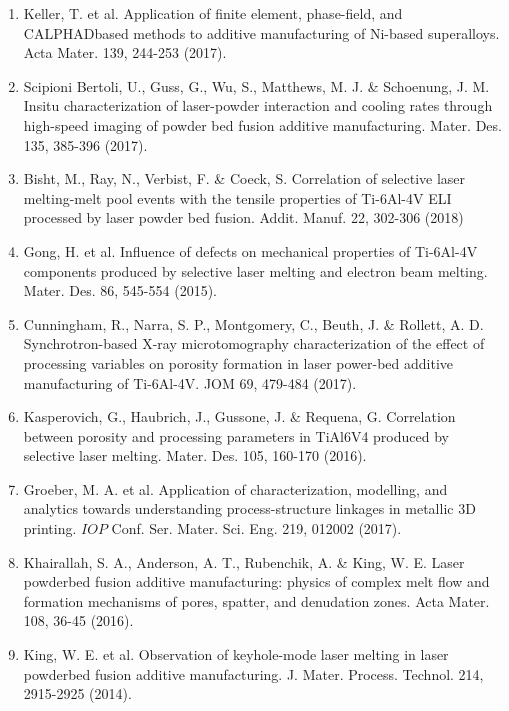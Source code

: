 \documentclass[10pt]{article}
\begin{document}
\begin{enumerate}
  \item Keller, T. et al. Application of finite element, phase-field, and CALPHADbased methods to additive manufacturing of Ni-based superalloys. Acta Mater. 139, 244-253 (2017).

  \item Scipioni Bertoli, U., Guss, G., Wu, S., Matthews, M. J. \& Schoenung, J. M. Insitu characterization of laser-powder interaction and cooling rates through high-speed imaging of powder bed fusion additive manufacturing. Mater. Des. 135, 385-396 (2017).

  \item Bisht, M., Ray, N., Verbist, F. \& Coeck, S. Correlation of selective laser melting-melt pool events with the tensile properties of Ti-6Al-4V ELI processed by laser powder bed fusion. Addit. Manuf. 22, 302-306 (2018)

  \item Gong, H. et al. Influence of defects on mechanical properties of Ti-6Al-4V components produced by selective laser melting and electron beam melting. Mater. Des. 86, 545-554 (2015).

  \item Cunningham, R., Narra, S. P., Montgomery, C., Beuth, J. \& Rollett, A. D. Synchrotron-based X-ray microtomography characterization of the effect of processing variables on porosity formation in laser power-bed additive manufacturing of Ti-6Al-4V. JOM 69, 479-484 (2017).

  \item Kasperovich, G., Haubrich, J., Gussone, J. \& Requena, G. Correlation between porosity and processing parameters in TiAl6V4 produced by selective laser melting. Mater. Des. 105, 160-170 (2016).

  \item Groeber, M. A. et al. Application of characterization, modelling, and analytics towards understanding process-structure linkages in metallic $3 \mathrm{D}$ printing. $I O P$ Conf. Ser. Mater. Sci. Eng. 219, 012002 (2017).

  \item Khairallah, S. A., Anderson, A. T., Rubenchik, A. \& King, W. E. Laser powderbed fusion additive manufacturing: physics of complex melt flow and formation mechanisms of pores, spatter, and denudation zones. Acta Mater. 108, 36-45 (2016).

  \item King, W. E. et al. Observation of keyhole-mode laser melting in laser powderbed fusion additive manufacturing. J. Mater. Process. Technol. 214, 2915-2925 (2014).


\end{enumerate}
\end{document}
